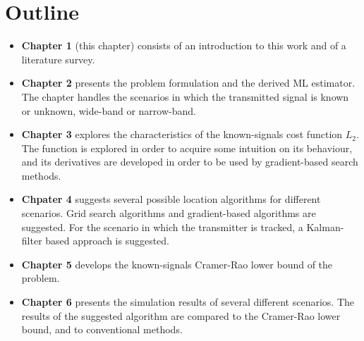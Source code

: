 \section{Outline}
\begin{itemize}
\item \textbf{Chapter 1} (this chapter) consists of an introduction to this work and of a literature survey.
\item \textbf{Chapter 2} presents the problem formulation and the derived ML estimator. The chapter handles the scenarios in which the transmitted signal is known or unknown, wide-band or narrow-band.
\item \textbf{Chapter 3} explores the characteristics of the known-signals cost function $L_2$. The function is explored in order to acquire some intuition on its behaviour, and its derivatives are developed in order to be used by gradient-based search methods.
\item \textbf{Chpater 4} suggests several possible location algorithms for different scenarios. Grid search algorithms and gradient-based algorithms are suggested. For the scenario in which the transmitter is tracked, a Kalman-filter based approach is suggested.
\item \textbf{Chapter 5} develops the known-signals Cramer-Rao lower bound of the problem.
\item \textbf{Chapter 6} presents the simulation results of several different scenarios. The results of the suggested algorithm are compared to the Cramer-Rao lower bound, and to conventional methods.
\end{itemize}